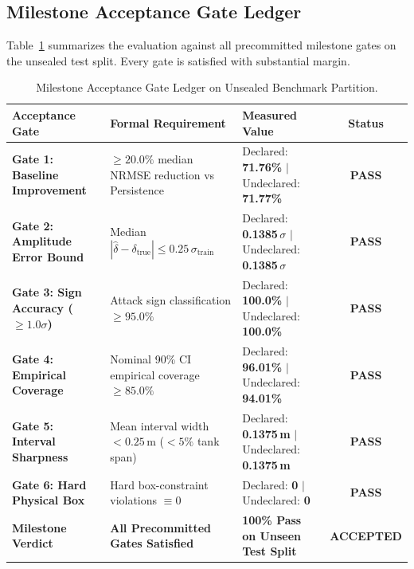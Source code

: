 \documentclass[11pt,a4paper]{article}
\begin{document}
\subsection{Milestone Acceptance Gate Ledger}
Table~\ref{tab:gates} summarizes the evaluation against all precommitted milestone gates on the unsealed test split. Every gate is satisfied with substantial margin.

\begin{table}[htbp]
\centering
\small
\caption{Milestone Acceptance Gate Ledger on Unsealed Benchmark Partition.}
\label{tab:gates}
\begin{tabularx}{\textwidth}{p{} X p{} c}
\toprule
\textbf{Acceptance Gate} & \textbf{Formal Requirement} & \textbf{Measured Value} & \textbf{Status} \\
\midrule
\textbf{Gate 1: Baseline Improvement} & $\ge 20.0\%$ median NRMSE reduction vs Persistence & Declared: \textbf{71.76\%} $|$ Undeclared: \textbf{71.77\%} & \textbf{PASS} \\
\textbf{Gate 2: Amplitude Error Bound} & Median $|\hat{\delta} - \delta_{\text{true}}| \le 0.25\,\sigma_{\text{train}}$ & Declared: \textbf{0.1385\,$\sigma$} $|$ Undeclared: \textbf{0.1385\,$\sigma$} & \textbf{PASS} \\
\textbf{Gate 3: Sign Accuracy ($\ge 1.0\sigma$)} & Attack sign classification $\ge 95.0\%$ & Declared: \textbf{100.0\%} $|$ Undeclared: \textbf{100.0\%} & \textbf{PASS} \\
\textbf{Gate 4: Empirical Coverage} & Nominal 90\% CI empirical coverage $\ge 85.0\%$ & Declared: \textbf{96.01\%} $|$ Undeclared: \textbf{94.01\%} & \textbf{PASS} \\
\textbf{Gate 5: Interval Sharpness} & Mean interval width $< 0.25$\,m ($<5\%$ tank span) & Declared: \textbf{0.1375\,m} $|$ Undeclared: \textbf{0.1375\,m} & \textbf{PASS} \\
\textbf{Gate 6: Hard Physical Box} & Hard box-constraint violations $\equiv 0$ & Declared: \textbf{0} $|$ Undeclared: \textbf{0} & \textbf{PASS} \\
\midrule
\textbf{Milestone Verdict} & \textbf{All Precommitted Gates Satisfied} & \textbf{100\% Pass on Unseen Test Split} & \textbf{ACCEPTED} \\
\bottomrule
\end{tabularx}
\end{table}


\end{document}
